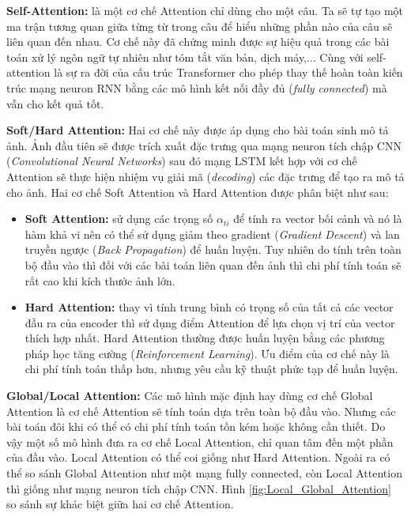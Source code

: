 \documentclass[14pt, a4paper]{article}
\numberwithin{equation}{section}
\numberwithin{algorithm}{section}
\numberwithin{figure}{section}
\numberwithin{table}{section}
\numberwithin{dl}{section}
\numberwithin{md}{section}
\numberwithin{bd}{section}
\numberwithin{dn}{section}
\numberwithin{hq}{section}
\begin{document}
    \textbf{Self-Attention:} là một cơ chế Attention chỉ dùng cho một câu. 
    Ta sẽ tự tạo một ma trận tương quan giữa từng từ trong câu để hiểu những phần nào của câu sẽ liên quan đến nhau.
    Cơ chế này đã chứng minh được sự hiệu quả trong các bài toán xử lý ngôn ngữ tự nhiên như tóm tắt văn bản, dịch máy,... 
    Cùng với self-attention là sự ra đời của cấu trúc Transformer \cite{vaswani2017attention} cho phép thay thế hoàn toàn kiến trúc mạng neuron RNN bằng các mô hình kết nối đầy đủ (\textit{fully connected}) mà vẫn cho kết quả tốt.


    \textbf{Soft/Hard Attention:} Hai cơ chế này được áp dụng cho bài toán sinh mô tả ảnh.
    Ảnh đầu tiên sẽ được trích xuất đặc trưng qua mạng neuron tích chập CNN (\textit{Convolutional Neural Networks}) sau đó mạng LSTM kết hợp với cơ chế Attention sẽ thực hiện nhiệm vụ giải mã (\textit{decoding}) các đặc trưng để tạo ra mô tả cho ảnh.
    Hai cơ chế Soft Attention và Hard Attention được phân biệt như sau:

    \begin{itemize}
        \item \textbf{Soft Attention:} sử dụng các trọng số $\alpha_{ti}$ để tính ra vector bối cảnh và nó là hàm khả vi nên có thể sử dụng giảm theo gradient (\textit{Gradient Descent}) và lan truyền ngược (\textit{Back Propagation}) để huấn luyện. 
        Tuy nhiên do tính trên toàn bộ đầu vào thì đối với các bài toán liên quan đến ảnh thì chi phí tính toán sẽ rất cao khi kích thước ảnh lớn.
        \item \textbf{Hard Attention:} thay vì tính trung bình có trọng số của tất cả các vector đầu ra của encoder thì sử dụng điểm Attention để lựa chọn vị trí của vector thích hợp nhất.
        Hard Attention thường được huấn luyện bằng các phương pháp học tăng cường (\textit{Reinforcement Learning}). Ưu điểm của cơ chế này là chi phí tính toán thấp hơn, nhưng yêu cầu kỹ thuật phức tạp để huấn luyện.
    \end{itemize}

    \textbf{Global/Local Attention:} Các mô hình mặc định hay dùng cơ chế Global Attention là cơ chế Attention sẽ tính toán dựa trên toàn bộ đầu vào.
    Nhưng các bài toán đôi khi có thể có chi phí tính toán tốn kém hoặc không cần thiết. Do vậy một số mô hình đưa ra cơ chế Local Attention, chỉ quan tâm đến một phần của đầu vào.
    Local Attention có thể coi giống như Hard Attention. Ngoài ra có thể so sánh Global Attention như một mạng fully connected, còn Local Attention thì giống như mạng neuron tích chập CNN.
    Hình \ref{fig:Local_Global_Attention} so sánh sự khác biệt giữa hai cơ chế Attention.
\end{document}
